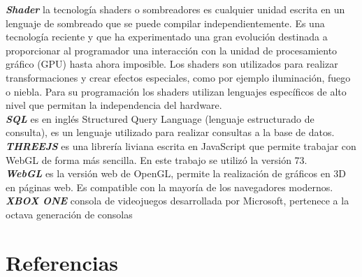 \documentclass[12pt]{article}
\begin{document}
\textbf{\textit{Shader}} la tecnología shaders o sombreadores es cualquier unidad escrita en un lenguaje de sombreado que se puede compilar independientemente. Es una tecnología reciente y que ha experimentado una gran evolución destinada a proporcionar al programador una interacción con la unidad de procesamiento gráfico (GPU) hasta ahora imposible. Los shaders son utilizados para realizar transformaciones y crear efectos especiales, como por ejemplo iluminación, fuego o niebla. Para su programación los shaders utilizan lenguajes específicos de alto nivel que permitan la independencia del hardware.\\
\textbf{\textit{SQL}} es en inglés Structured Query Language (lenguaje estructurado de consulta), es un lenguaje utilizado para realizar consultas a la base de datos.\\
\textbf{\textit{THREEJS}} es una librería liviana escrita en JavaScript que permite trabajar con WebGL de forma más sencilla. En este trabajo se utilizó la versión 73.\\
\textbf{\textit{WebGL}} es la versión web de OpenGL, permite la realización de gráficos en 3D en páginas web. Es compatible con la mayoría de los navegadores modernos.\\
\textbf{\textit{XBOX ONE}} consola de videojuegos desarrollada por Microsoft, pertenece a la octava generación de consolas
\clearpage
\section{Referencias}
\end{document}
